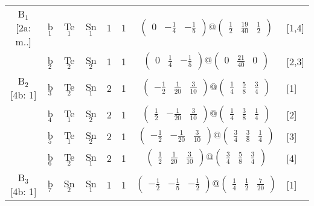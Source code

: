 \documentclass[fleqn,10pt,landscape]{article}
\begin{document}
\begin{itemize}
\begin{center}
\begin{longtable}{cc|cc|c|c|c|l}
B$_{1}$ [2a: m..] & b$_{1}$ & Te$_{1}$ & Sn$_{1}$ & 1 & 1 & $\begin{pmatrix} 0 & - \frac{1}{4} & - \frac{1}{5} \end{pmatrix}@\begin{pmatrix} \frac{1}{2} & \frac{19}{40} & \frac{1}{2} \end{pmatrix}$ & [1,4] \\
& b$_{2}$ & Te$_{2}$ & Sn$_{2}$ & 1 & 1 & $\begin{pmatrix} 0 & \frac{1}{4} & - \frac{1}{5} \end{pmatrix}@\begin{pmatrix} 0 & \frac{21}{40} & 0 \end{pmatrix}$ & [2,3] \\ \hline
B$_{2}$ [4b: 1] & b$_{3}$ & Te$_{2}$ & Sn$_{1}$ & 2 & 1 & $\begin{pmatrix} - \frac{1}{2} & \frac{1}{20} & \frac{3}{10} \end{pmatrix}@\begin{pmatrix} \frac{1}{4} & \frac{5}{8} & \frac{3}{4} \end{pmatrix}$ & [1] \\
& b$_{4}$ & Te$_{1}$ & Sn$_{2}$ & 2 & 1 & $\begin{pmatrix} \frac{1}{2} & - \frac{1}{20} & \frac{3}{10} \end{pmatrix}@\begin{pmatrix} \frac{1}{4} & \frac{3}{8} & \frac{1}{4} \end{pmatrix}$ & [2] \\
& b$_{5}$ & Te$_{1}$ & Sn$_{2}$ & 2 & 1 & $\begin{pmatrix} - \frac{1}{2} & - \frac{1}{20} & \frac{3}{10} \end{pmatrix}@\begin{pmatrix} \frac{3}{4} & \frac{3}{8} & \frac{1}{4} \end{pmatrix}$ & [3] \\
& b$_{6}$ & Te$_{2}$ & Sn$_{1}$ & 2 & 1 & $\begin{pmatrix} \frac{1}{2} & \frac{1}{20} & \frac{3}{10} \end{pmatrix}@\begin{pmatrix} \frac{3}{4} & \frac{5}{8} & \frac{3}{4} \end{pmatrix}$ & [4] \\ \hline
B$_{3}$ [4b: 1] & b$_{7}$ & Sn$_{2}$ & Sn$_{1}$ & 1 & 1 & $\begin{pmatrix} - \frac{1}{2} & - \frac{1}{5} & - \frac{1}{2} \end{pmatrix}@\begin{pmatrix} \frac{1}{4} & \frac{1}{2} & \frac{7}{20} \end{pmatrix}$ & [1] \\

\end{longtable}
\end{center}
\end{itemize}
\end{document}
